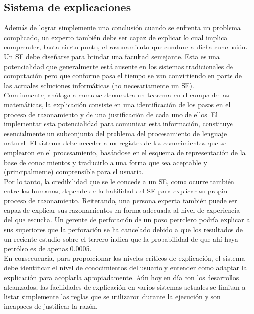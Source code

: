 \subsection{	Sistema de explicaciones}
Además de lograr simplemente una conclusión cuando se enfrenta un problema complicado, un experto también debe ser capaz de explicar lo cual implica comprender, hasta cierto punto, el razonamiento que conduce a dicha conclusión. Un SE debe diseñarse para brindar una facultad semejante. Esta es una potencialidad que generalmente está ausente en los sistemas tradicionales de computación pero que conforme pasa el tiempo se van convirtiendo en parte de las actuales soluciones informáticas (no necesariamente un SE).\\
Comúnmente, análogo a como se demuestra un teorema en el campo de las matemáticas,  la explicación consiste en una identificación de los pasos en el proceso de razonamiento y de una justificación de cada uno de ellos.  El implementar esta potencialidad para comunicar esta información, constituye esencialmente un subconjunto del problema del procesamiento de lenguaje natural. El sistema debe acceder a un registro de los conocimientos que se emplearon en el procesamiento, basándose en el esquema de representación de la base de conocimientos y traducirlo a una forma que sea aceptable y (principalmente) comprensible para el usuario.\\
Por lo tanto,  la credibilidad que se le concede a un SE, como ocurre también entre los humanos, depende de la habilidad del SE para explicar su propio proceso de razonamiento.  Reiterando, una persona experta también puede ser capaz de explicar sus razonamientos en forma adecuada al nivel de experiencia del que escucha. Un gerente de perforación de un pozo petrolero podría explicar a sus superiores que la perforación se ha cancelado debido a que los resultados de un reciente estudio sobre el terrero indica que la probabilidad de que ahí haya petróleo es de apenas 0.0005. \\
En consecuencia, para proporcionar los niveles críticos de explicación, el sistema debe identificar el nivel de conocimientos del usuario y entender cómo adaptar la explicación para acoplarla apropiadamente. Aún hoy en día con los desarrollos alcanzados, las facilidades de explicación en varios sistemas actuales se limitan a listar simplemente las reglas que se utilizaron durante la ejecución y son incapaces de justificar la razón.\\
